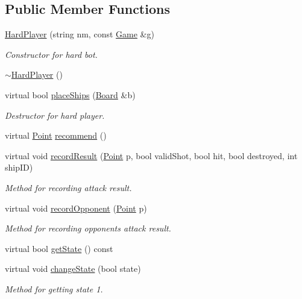 \subsection*{Public Member Functions}
\begin{DoxyCompactItemize}
\item 
\mbox{\hyperlink{class_hard_player_a37cfa417c531f1988469965a7b4adc9e}{Hard\+Player}} (string nm, const \mbox{\hyperlink{class_game}{Game}} \&g)
\begin{DoxyCompactList}\small\item\em Constructor for hard bot. \end{DoxyCompactList}\item 
\mbox{\hyperlink{class_hard_player_a86f3946384b7ca6c3e92a992b11a0ba8}{$\sim$\+Hard\+Player}} ()
\item 
virtual bool \mbox{\hyperlink{class_hard_player_a27d0ad3353eba585d7a93d2092036f98}{place\+Ships}} (\mbox{\hyperlink{class_board}{Board}} \&b)
\begin{DoxyCompactList}\small\item\em Destructor for hard player. \end{DoxyCompactList}\item 
virtual \mbox{\hyperlink{class_point}{Point}} \mbox{\hyperlink{class_hard_player_ae1d21325a648a88f1bf51f2b0b286190}{recommend}} ()
\item 
virtual void \mbox{\hyperlink{class_hard_player_aa8977ca3294daf996707bd0ff434d69e}{record\+Result}} (\mbox{\hyperlink{class_point}{Point}} p, bool valid\+Shot, bool hit, bool destroyed, int ship\+ID)
\begin{DoxyCompactList}\small\item\em Method for recording attack result. \end{DoxyCompactList}\item 
virtual void \mbox{\hyperlink{class_hard_player_a986175fb966099ac5fe39950e18799ae}{record\+Opponent}} (\mbox{\hyperlink{class_point}{Point}} p)
\begin{DoxyCompactList}\small\item\em Method for recording opponent\textquotesingle{}s attack result. \end{DoxyCompactList}\item 
virtual bool \mbox{\hyperlink{class_hard_player_a063d9f4071b687339fbc134239771ef3}{get\+State}} () const
\item 
virtual void \mbox{\hyperlink{class_hard_player_aa25afded558192bd39d8d2c1b2a8209a}{change\+State}} (bool state)
\begin{DoxyCompactList}\small\item\em Method for getting state 1. \end{DoxyCompactList}\item 

\end{DoxyCompactItemize}
